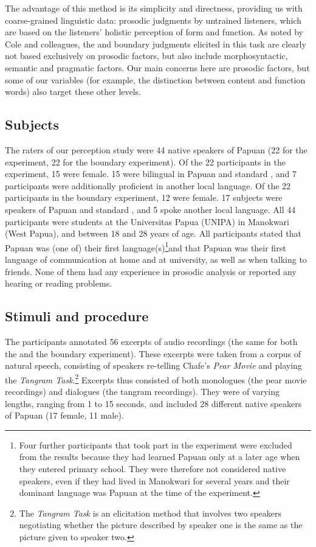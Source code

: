 \documentclass[output=paper
,modfonts
,nonflat]{langsci/langscibook}
\begin{document}
The advantage of this method is its simplicity and directness, providing us with coarse-grained linguistic data: prosodic judgments by untrained listeners, which are based on the listeners’ holistic perception of form and function. As noted by Cole and colleagues, the  and boundary judgments elicited in this task are clearly not based exclusively on prosodic factors, but also include morphosyntactic, semantic and pragmatic factors. Our main concerns here are prosodic factors, but some of our variables (for example, the distinction between content and function words) also target these other levels. 

\subsection{{{Subjects}}}

The raters of our perception study were 44 native speakers of Papuan  (22 for the  experiment, 22 for the boundary experiment). Of the 22 participants in the  experiment, 15 were female. 15 were bilingual in Papuan  and standard , and 7 participants were additionally proficient in another local language. Of the 22 participants in the boundary experiment, 12 were female. 17 subjects were speakers of Papuan  and standard , and 5 spoke another local language. All 44 participants were students at the Universitas Papua (UNIPA) in Manokwari (West Papua), and between 18 and 28 years of age. All participants stated that Papuan  was (one of) their first language(s)\footnote{Four further participants that took part in the  experiment were excluded from the results because they had learned Papuan  only at a later age when they entered primary school. They were therefore not considered native speakers, even if they had lived in Manokwari for several years and their dominant language was Papuan  at the time of the experiment.}and that Papuan  was their first language of communication at home and at university, as well as when talking to friends. None of them had any experience in prosodic analysis or reported any hearing or reading problems.

\subsection{{{Stimuli and procedure}}}

The participants annotated 56 excerpts of audio recordings (the same for both the  and the boundary experiment). These excerpts were taken from a corpus of natural speech, consisting of speakers re-telling Chafe’s \textit{Pear Movie} \citep{Chafe1980} and playing the \textit{Tangram Task}.\footnote{The \textit{Tangram Task} is an elicitation method that involves two speakers negotiating whether the picture described by speaker one is the same as the picture given to speaker two.} Excerpts thus consisted of both monologues (the pear movie recordings) and dialogues (the tangram recordings). They were of varying lengths, ranging from 1 to 15 seconds, and included 28 different native speakers of Papuan  (17 female, 11 male). 
\end{document}

